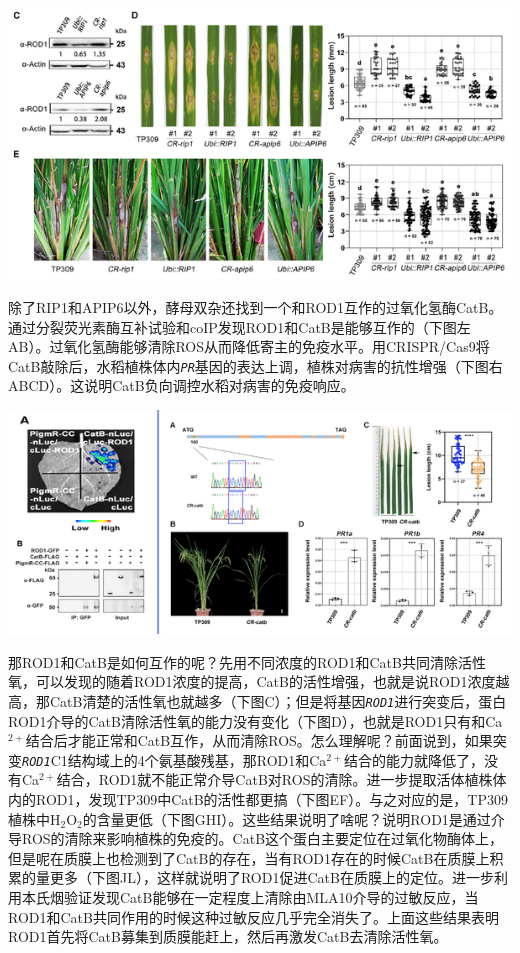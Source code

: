 \documentclass[
  10pt,
]{book}
\begin{document}
\includegraphics{figures/HeZuhuaCell2021/11.png}

除了RIP1和APIP6以外，酵母双杂还找到一个和ROD1互作的过氧化氢酶CatB。通过分裂荧光素酶互补试验和coIP发现ROD1和CatB是能够互作的（下图左AB）。过氧化氢酶能够清除ROS从而降低寄主的免疫水平。用CRISPR/Cas9将CatB敲除后，水稻植株体内\emph{\texttt{PR}}基因的表达上调，植株对病害的抗性增强（下图右ABCD）。这说明CatB负向调控水稻对病害的免疫响应。

\includegraphics{figures/HeZuhuaCell2021/12.png}

那ROD1和CatB是如何互作的呢？先用不同浓度的ROD1和CatB共同清除活性氧，可以发现的随着ROD1浓度的提高，CatB的活性增强，也就是说ROD1浓度越高，那CatB清楚的活性氧也就越多（下图C）；但是将基因\emph{\texttt{ROD1}}进行突变后，蛋白ROD1介导的CatB清除活性氧的能力没有变化（下图D），也就是ROD1只有和Ca\(^{2+}\)结合后才能正常和CatB互作，从而清除ROS。怎么理解呢？前面说到，如果突变\emph{\texttt{ROD1}}C1结构域上的4个氨基酸残基，那ROD1和Ca\(^{2+}\)结合的能力就降低了，没有Ca\(^{2+}\)结合，ROD1就不能正常介导CatB对ROS的清除。进一步提取活体植株体内的ROD1，发现TP309中CatB的活性都更搞（下图EF）。与之对应的是，TP309植株中H\(_2\)O\(_2\)的含量更低（下图GHI）。这些结果说明了啥呢？说明ROD1是通过介导ROS的清除来影响植株的免疫的。CatB这个蛋白主要定位在过氧化物酶体上，但是呢在质膜上也检测到了CatB的存在，当有ROD1存在的时候CatB在质膜上积累的量更多（下图JL），这样就说明了ROD1促进CatB在质膜上的定位。进一步利用本氏烟验证发现CatB能够在一定程度上清除由MLA10介导的过敏反应，当ROD1和CatB共同作用的时候这种过敏反应几乎完全消失了。上面这些结果表明ROD1首先将CatB募集到质膜能赶上，然后再激发CatB去清除活性氧。
\end{document}
